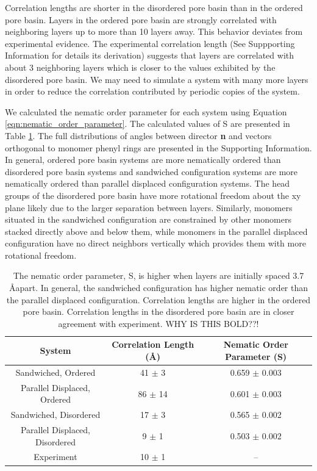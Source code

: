 \documentclass[journal=jpcbfk,manusciprt=article]{achemso}
\begin{document}
  Correlation lengths are shorter in the disordered pore basin than in the
  ordered pore basin. Layers in the ordered pore basin are strongly correlated
  with neighboring layers up to more than 10 layers away. This behavior deviates
  from experimental evidence. The experimental correlation length (See
  Suppporting Information for details its derivation) suggests that layers are
  correlated with about 3 neighboring layers which is closer to the values
  exhibited by the disordered pore basin. We may need to simulate a system with
  many more layers in order to reduce the correlation contributed by periodic
  copies of the system. 


  We calculated the nematic order parameter for each system using Equation
  \ref{eqn:nematic_order_parameter}. The calculated values of S are presented in
  Table \ref{table:nematic}. The full distributions of angles between director
  \textbf{n} and vectors orthogonal to monomer phenyl rings are presented in the
  Supporting Information. In general, ordered pore basin systems are more
  nematically ordered than disordered pore basin systems and sandwiched
  configuration systems are more nematically ordered than parallel displaced
  configuration systems. The head groups of the disordered pore basin have more
  rotational freedom about the xy plane likely due to the larger separation
  between layers. Similarly, monomers situated in the sandwiched configuration
  are constrained by other monomers stacked directly above and below them, while
  monomers in the parallel displaced configuration have no direct neighbors
  vertically which provides them with more rotational freedom. 

  \begin{table}[h]
  \centering
  \begin{tabular}{ccc}
  \toprule
  System & Correlation Length (\AA) & Nematic Order Parameter (S) \\
  \midrule
  Sandwiched, Ordered & 41 $\pm$ 3 & 0.659 $\pm$ 0.003 \\
  Parallel Displaced, Ordered & 86 $\pm$ 14 & 0.601 $\pm$ 0.003 \\
  Sandwiched, Disordered & 17 $\pm$ 3 & 0.565 $\pm$ 0.002 \\
  Parallel Displaced, Disordered & 9 $\pm$ 1 & 0.503 $\pm$ 0.002 \\
  Experiment & 10 $\pm$ 1 & -- \\
  \bottomrule
  \end{tabular}
  \caption{The nematic order parameter, S, is higher when layers are initially spaced
  3.7 \AA apart. In general, the sandwiched configuration has higher nematic order
  than the parallel displaced configuration. Correlation lengths are higher in
  the ordered pore basin. Correlation lengths in the disordered pore basin are
  in closer agreement with experiment. WHY IS THIS BOLD??!}~\label{table:nematic}
  \end{table}
\end{document}
